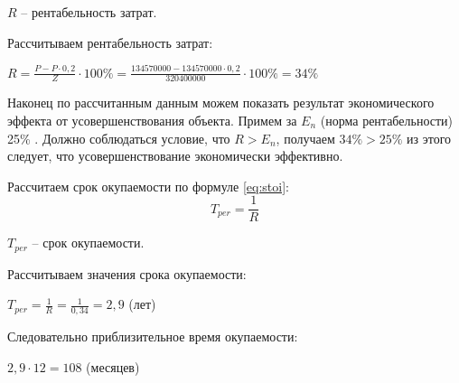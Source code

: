 $R$ -- рентабельность затрат.

Рассчитываем рентабельность затрат:
\begin{flushleft}
\begin{math}
R=\frac{P-P \cdot 0,2}{Z} \cdot 100\% = \frac{134570000 - 134570000 \cdot 0,2}{320400000} \cdot 100\% = 34\% 
\end{math}\end{flushleft}

Наконец по рассчитанным данным можем показать результат экономического эффекта от усовершенствования объекта. Примем  за $E_{n}$ (норма рентабельности) 25\% . Должно соблюдаться условие, что $R>E_{n}$, получаем $34\%>25\%$ из этого следует, что усовершенствование экономически эффективно.

Рассчитаем срок окупаемости по формуле \ref{eq:stoi}:
\begin{equation}\label{eq:stoi}
T_{per}=\frac{1}{R}
\end{equation}

$T_{per}$ -- срок окупаемости.

Рассчитываем значения срока окупаемости:
\begin{flushleft}
\begin{math}
T_{per}=\frac{1}{R} = \frac{1}{0,34} = 2,9 
\end{math} (лет)\end{flushleft}

Следовательно приблизительное время окупаемости:
\begin{flushleft}
\begin{math}
2,9 \cdot 12 = 108
\end{math} (месяцев)\end{flushleft}  

\pagebreak